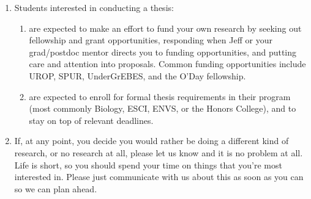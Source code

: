 \documentclass[12pt]{article}
\begin{document}
\begin{enumerate}
\item Students interested in conducting a thesis:
\begin{enumerate}
\item are expected to make an effort to fund your own research by seeking out fellowship and grant opportunities, responding when Jeff or your grad/postdoc mentor directs you to funding opportunities, and putting care and attention into proposals. Common funding opportunities include UROP, SPUR, UnderGrEBES, and the O'Day fellowship. 

\item are expected to enroll for formal thesis requirements in their program (most commonly Biology, ESCI, ENVS, or the Honors College), and to stay on top of relevant deadlines.

\end{enumerate}
\item If, at any point, you decide you would rather be doing a different kind of research, or no research at all, please let us know and it is no problem at all.  Life is short, so you should spend your time on things that you're most interested in.  Please just communicate with us about this as soon as you can so we can plan ahead.
\end{enumerate}
\end{document}
